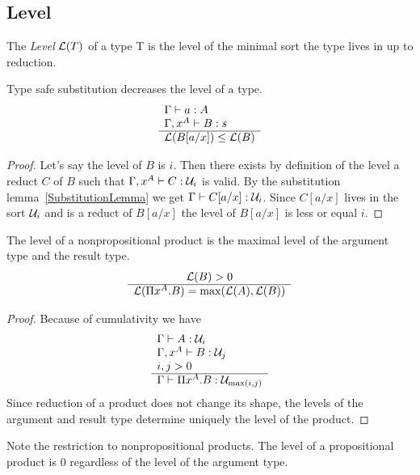 \subsection{Level}


\begin{definition}
    The \emph{Level} ${\cal L}(T)$ of a type T is the level of the minimal sort
    the type lives in up to reduction.
\end{definition}


\begin{theorem}
    \label{thm:LevelTypeSafeSubstitution}
    Type safe substitution decreases the level of a type.
    $$
    \begin{array}{l} 
        \Gamma \vdash a : A
        \\
        \Gamma, x^A \vdash B: s
     \\ \hline 
        {\cal L}(B[a/x]) \le {\cal L}(B)
    \end{array}
    $$
    \begin{proof}
        Let's say the level of $B$ is $i$. Then there exists by definition of
        the level a reduct $C$ of $B$ such that $\Gamma, x^A \vdash C: {\cal U}_i$
        is valid. By the substitution lemma~\ref{SubstitutionLemma} we get
        $\Gamma \vdash C[a/x]: {\cal U}_i$. Since $C[a/x]$ lives in the sort
        ${\cal U}_i$ and is a reduct of $B[a/x]$ the level of $B[a/x]$ is less or
        equal $i$.
    \end{proof}
\end{theorem}




\begin{theorem}
    \label{thm:LevelProduct}
    The level of a nonpropositional product is the maximal level of the argument
    type and the result type.
    $$
    \begin{array}{c} 
        {\cal L}(B) > 0
     \\ \hline 
        {\cal L}(\Pi x^A.B) = {\text{max}}({\cal L}(A), {\cal L}(B))
    \end{array}
    $$
    \begin{proof}
        Because of cumulativity we have
        $$
        \begin{array}{l} 
            \Gamma \vdash A: {\cal U}_i
            \\
            \Gamma,x^A \vdash B: {\cal U}_j
            \\
            i,j > 0
         \\ \hline 
            \Gamma \vdash \Pi x^A. B : {\cal U}_{{\text{max}}(i,j)}
        \end{array}
        $$
        Since reduction of a product does not change its shape, the levels of
        the argument and result type determine uniquely the level of the
        product.
    \end{proof}

    Note the restriction to nonpropositional products. The level of a
    propositional product is 0 regardless of the level of the argument type.
\end{theorem}




